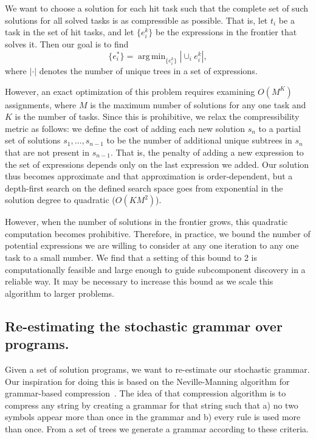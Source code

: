\documentclass{article}
\DeclareMathOperator*{\argmin}{arg\,min}
\begin{document}
We want to choose a solution for each hit task such that the complete set
of such solutions for all solved tasks is as compressible as
possible. That is, let $t_i$ be a task in the set of hit tasks, and
let $\{e^k_i\}$ be the expressions in the frontier that solves
it. Then our goal is to find
\[
\{e^*_i\} = \argmin_{\{e^k_i\}} | \cup_i e^k_i |,
\]
where $|\cdot|$ denotes the number of unique trees in a set of expressions.

However, an exact optimization of this problem requires examining
$O(M^K)$ assignments, where $M$ is the maximum number of solutions for
any one task and $K$ is the number of tasks. Since this is
prohibitive, we relax the compressibility metric as follows: we define
the cost of adding each new solution $s_n$ to a partial set of
solutions $s_1, \dots, s_{n-1}$ to be the number of additional unique
subtrees in $s_n$ that are not present in $s_{n-1}$. That is, the
penalty of adding a new expression to the set of expressions depends
only on the last expression we added. Our solution thus becomes
approximate and that approximation is order-dependent, but a
depth-first search on the defined search space goes from exponential
in the solution degree to quadratic ($O(KM^2)$). 

However, when the number of solutions in the frontier grows, this
quadratic computation becomes prohibitive. Therefore, in practice, we
bound the number of potential expressions we are willing to consider
at any one iteration to any one task to a small number. We find that a
setting of this bound to 2 is computationally feasible and large
enough to guide subcomponent discovery in a reliable way. It may be
necessary to increase this bound as we scale this algorithm to larger
problems.

\subsection{Re-estimating the stochastic grammar over programs.}

Given a set of solution programs, we want to re-estimate our
stochastic grammar. Our inspiration for doing this is based on
the Neville-Manning algorithm for grammar-based
compression~\cite{nevill1997identifying}. The idea of that compression
algorithm is to compress any string by creating a grammar for that
string such that a) no two symbols appear more than once in the
grammar and b) every rule is used more than once. From a set of trees
we generate a grammar according to these criteria.
\end{document}
